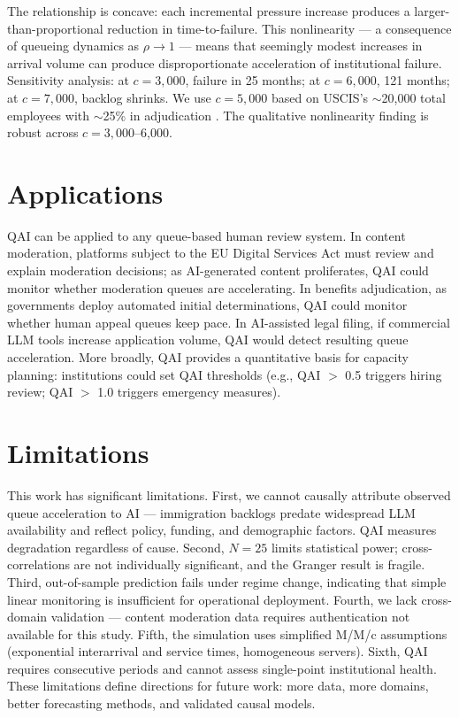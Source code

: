\documentclass{article}
\begin{document}
The relationship is concave: each incremental pressure increase produces a larger-than-proportional reduction in time-to-failure. This nonlinearity — a consequence of queueing dynamics as $\rho \to 1$ — means that seemingly modest increases in arrival volume can produce disproportionate acceleration of institutional failure. Sensitivity analysis: at $c=3,000$, failure in 25 months; at $c=6,000$, 121 months; at $c=7,000$, backlog shrinks. We use $c=5,000$ based on USCIS's $\sim$20,000 total employees with $\sim$25\% in adjudication \cite{dhs-budget2025}. The qualitative nonlinearity finding is robust across $c=3,000$--6,000.

\section{Applications}

QAI can be applied to any queue-based human review system. In content moderation, platforms subject to the EU Digital Services Act must review and explain moderation decisions; as AI-generated content proliferates, QAI could monitor whether moderation queues are accelerating. In benefits adjudication, as governments deploy automated initial determinations, QAI could monitor whether human appeal queues keep pace. In AI-assisted legal filing, if commercial LLM tools increase application volume, QAI would detect resulting queue acceleration. More broadly, QAI provides a quantitative basis for capacity planning: institutions could set QAI thresholds (e.g., QAI $>$ 0.5 triggers hiring review; QAI $>$ 1.0 triggers emergency measures).

\section{Limitations}

This work has significant limitations. First, we cannot causally attribute observed queue acceleration to AI — immigration backlogs predate widespread LLM availability and reflect policy, funding, and demographic factors. QAI measures degradation regardless of cause. Second, $N=25$ limits statistical power; cross-correlations are not individually significant, and the Granger result is fragile. Third, out-of-sample prediction fails under regime change, indicating that simple linear monitoring is insufficient for operational deployment. Fourth, we lack cross-domain validation — content moderation data requires authentication not available for this study. Fifth, the simulation uses simplified M/M/c assumptions (exponential interarrival and service times, homogeneous servers). Sixth, QAI requires consecutive periods and cannot assess single-point institutional health. These limitations define directions for future work: more data, more domains, better forecasting methods, and validated causal models.
\end{document}
